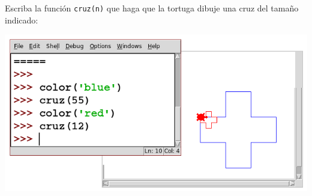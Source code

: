 Escriba la función \lstinline+cruz(n)+
que haga que la tortuga dibuje una cruz
del tamaño indicado:

\includegraphics[width=\textwidth]{cruz/cruz}


